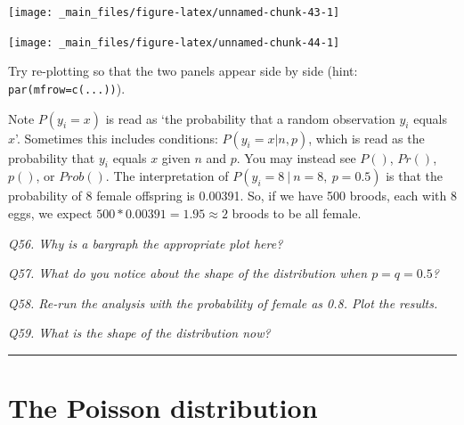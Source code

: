\documentclass[
  11pt,
  a4paper,
]{book}
\newenvironment{Shaded}{\begin{snugshade}}{\end{snugshade}}
\newcommand{\AttributeTok}[1]{\textcolor[rgb]{0.77,0.63,0.00}{#1}}
\newcommand{\FunctionTok}[1]{\textcolor[rgb]{0.00,0.00,0.00}{#1}}
\newcommand{\NormalTok}[1]{#1}
\newcommand{\OtherTok}[1]{\textcolor[rgb]{0.56,0.35,0.01}{#1}}
\newcommand{\SpecialCharTok}[1]{\textcolor[rgb]{0.00,0.00,0.00}{#1}}
\newcommand{\StringTok}[1]{\textcolor[rgb]{0.31,0.60,0.02}{#1}}
\begin{document}
\begin{center}\texttt{[image: \_main\_files/figure-latex/unnamed-chunk-43-1]} \end{center}

\begin{Shaded}
\end{Shaded}

\begin{center}\texttt{[image: \_main\_files/figure-latex/unnamed-chunk-44-1]} \end{center}

Try re-plotting so that the two panels appear side by side (hint: \texttt{par(mfrow=c(...))}).

Note \(P(y_i=x)\) is read as `the probability that a random observation \(y_i\) equals \(x\)'. Sometimes this includes conditions: \(P(y_i=x|n,p)\), which is read as the probability that \(y_i\) equals \(x\) given \(n\) and \(p\). You may instead see \(P()\), \(Pr()\), \(p()\), or \(Prob()\). The interpretation of \(P(y_i=8\ |\ n=8,\ p=0.5)\) is that the probability of 8 female offspring is 0.00391. So, if we have 500 broods, each with 8 eggs, we expect \(500 * 0.00391 = 1.95 \approx 2\) broods to be all female.

\emph{Q56. Why is a bargraph the appropriate plot here?}

\emph{Q57. What do you notice about the shape of the distribution when \(p=q=0.5\)?}

\emph{Q58. Re-run the analysis with the probability of female as 0.8. Plot the results.}

\emph{Q59. What is the shape of the distribution now?}

\begin{center}\rule{0.5\linewidth}{0.5pt}\end{center}

\hypertarget{the-poisson-distribution}{%
\section{The Poisson distribution}\label{the-poisson-distribution}}
\end{document}
